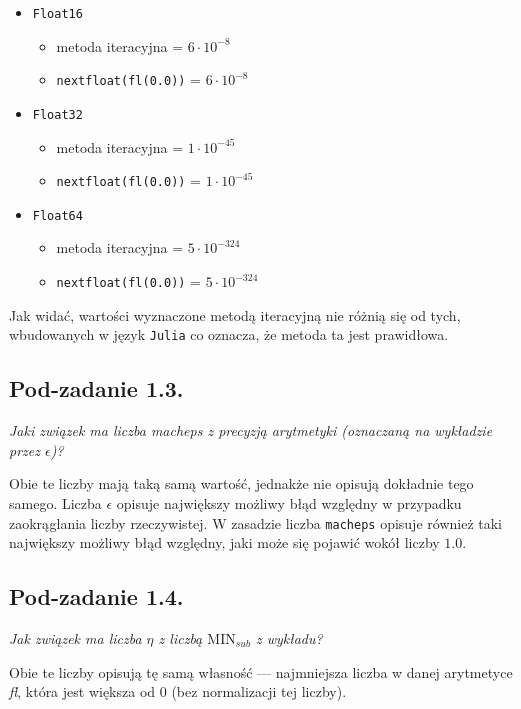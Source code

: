 \documentclass[10pt]{article}
\begin{document}
\begin{itemize}
    \item \texttt{Float16}
    \begin{itemize}
        \item metoda iteracyjna = $6 \cdot 10^{-8}$
        \item \texttt{nextfloat(fl(0.0))} = $6 \cdot 10^{-8}$
    \end{itemize}
    \item \texttt{Float32}
    \begin{itemize}
        \item metoda iteracyjna = $1 \cdot 10^{-45}$
        \item \texttt{nextfloat(fl(0.0))} = $1 \cdot 10^{-45}$
    \end{itemize}
    \item \texttt{Float64}
    \begin{itemize}
        \item metoda iteracyjna = $5 \cdot 10^{-324}$
        \item \texttt{nextfloat(fl(0.0))} = $5 \cdot 10^{-324}$
    \end{itemize}
\end{itemize}

Jak widać, wartości wyznaczone metodą iteracyjną nie różnią się od tych, wbudowanych w język \texttt{Julia} co oznacza, że metoda ta jest prawidłowa.

\subsection{Pod-zadanie 1.3.}
\textit{Jaki związek ma liczba \textit{macheps} z precyzją arytmetyki (oznaczaną na wykładzie przez $\epsilon$)?}

Obie te liczby mają taką samą wartość, jednakże nie opisują dokładnie tego samego. Liczba $\epsilon$ opisuje największy możliwy błąd względny w przypadku zaokrąglania liczby rzeczywistej. W zasadzie liczba \texttt{macheps} opisuje również taki największy możliwy błąd względny, jaki może się pojawić wokół liczby $1.0$.

\subsection{Pod-zadanie 1.4.}
\textit{Jak związek ma liczba $\eta$ z liczbą $\mathrm{MIN}_{sub}$ z wykładu?}

Obie te liczby opisują tę samą własność — najmniejsza liczba w danej arytmetyce \textit{fl}, która jest większa od $0$ (bez normalizacji tej liczby).
\end{document}
